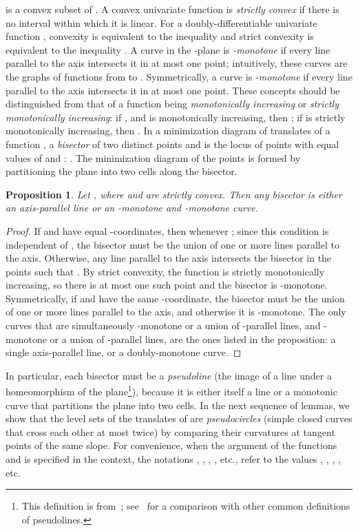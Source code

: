 \documentclass[10pt, conference, compsocconf]{IEEEtran}
\newtheorem{proposition}[theorem]{Proposition}
\begin{document}
is a convex subset of . 
A convex univariate function is \emph{strictly convex} if there is no interval within which it is linear. For a doubly-differentiable univariate function , convexity is equivalent to the inequality  and strict convexity is equivalent to the inequality . A curve in the -plane is \emph{-monotone} if every line parallel to the  axis intersects it in at most one point; intuitively, these curves are the graphs of functions from  to . Symmetrically, a curve is \emph{-monotone} if every line parallel to the  axis intersects it in at most one point. These concepts should be distinguished from that of a function being \emph{monotonically increasing} or \emph{strictly monotonically increasing}: if , and  is monotonically increasing, then ; if   is strictly monotonically increasing, then . In a minimization diagram of translates of a function , a \emph{bisector}  of two distinct points  and  is the locus of points with equal values of  and : . The minimization diagram of the points  is formed by partitioning the plane into two cells along the bisector.

\begin{proposition}
\label{prop:monotone-bisectors}
Let , where  and  are strictly convex. Then any bisector  is either an axis-parallel line or an -monotone and -monotone curve.
\end{proposition}

\begin{proof}
If  and  have equal -coordinates, then  whenever ; since this condition is independent of , the bisector must be the union of one or more lines parallel to the  axis. Otherwise, any line  parallel to the  axis intersects the bisector  in the points  such that . By strict convexity, the function  is strictly monotonically increasing, so there is at most one such point and the bisector is -monotone.
Symmetrically, if  and  have the same -coordinate, the bisector must be the union of one or more lines parallel to the  axis, and otherwise it is -monotone. The only curves that are simultaneously -monotone or a union of -parallel lines, and -monotone or a union of -parallel lines, are the ones listed in the proposition: a single axis-parallel line, or a doubly-monotone curve.
\end{proof}

In particular, each bisector must be a \emph{pseudoline} (the image of a line under a homeomorphism of the plane\footnote{This definition is from~\cite{Sho-VKF-91}; see~\cite{EppFalOvc-07} for a comparison with other common definitions of pseudolines.}), because it is either itself a line or a monotonic curve that partitions the plane into two cells. In the next sequence of lemmas, we show that the level sets of the translates of  are \emph{pseudocircles} (simple closed curves that cross each other at most twice) by comparing their curvatures at tangent points of the same slope. For convenience, when the argument of the functions  and  is specified in the context, the notations , , , , etc., refer to the values , , , , etc.
\end{document}
